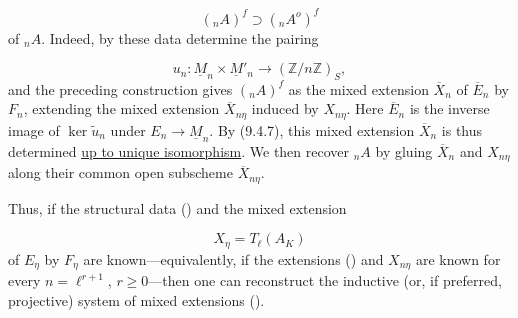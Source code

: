 \begin{equation*}
({}_nA)^f\supset({}_nA^o)^f
\end{equation*}
of ${}_nA$. Indeed, by  these data determine the pairing

\begin{equation*}
u_n:\underline M_n\times\underline M'_n
 \longrightarrow(\mathbb Z/n\mathbb Z)_S,
\end{equation*}
and the preceding construction gives $({}_nA)^f$ as the mixed extension
$\overline X_n$ of $\overline E_n$ by $F_n$, extending the mixed
extension $\overline X_{n\eta}$ induced by $X_{n\eta}$. Here
$\overline E_n$ is the inverse image of $\ker\widetilde u_n$ under
$E_n\to\underline M_n$. By (9.4.7), this mixed extension
$\overline X_n$ is thus determined \underline{up to unique
isomorphism}. We then recover ${}_nA$ by gluing $\overline X_n$ and
$X_{n\eta}$ along their common open subscheme $\overline X_{n\eta}$.

Thus, if the structural data () and the mixed extension

\begin{equation*}
X_\eta=T_\ell(A_K)
\end{equation*}
of $E_\eta$ by $F_\eta$ are known---equivalently, if the extensions
() and $X_{n\eta}$ are known for every $n=\ell^{r+1}$,
$r\geq0$---then one can reconstruct the inductive (or, if preferred,
projective) system of mixed extensions ().

